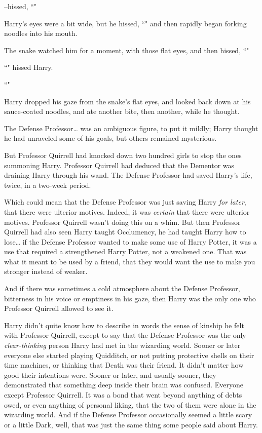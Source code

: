 \---hissed, ``"

Harry's eyes were a bit wide, but he hissed, ``" and then rapidly began forking noodles into his mouth.

The snake watched him for a moment, with those flat eyes, and then hissed, ``"

``" hissed Harry.

``"

Harry dropped his gaze from the snake's flat eyes, and looked back down at his sauce-coated noodles, and ate another bite, then another, while he thought.

The Defense Professor{\ldots} was an ambiguous figure, to put it mildly; Harry thought he had unraveled some of his goals, but others remained mysterious.

But Professor Quirrell had knocked down two hundred girls to stop the ones summoning Harry. Professor Quirrell had deduced that the Dementor was draining Harry through his wand. The Defense Professor had saved Harry's life, twice, in a two-week period.

Which could mean that the Defense Professor was just saving Harry \emph{for later}, that there were ulterior motives. Indeed, it was \emph{certain} that there were ulterior motives. Professor Quirrell wasn't doing this on a whim. But then Professor Quirrell had also seen Harry taught Occlumency, he had taught Harry how to lose{\ldots} if the Defense Professor wanted to make some use of Harry Potter, it was a use that required a strengthened Harry Potter, not a weakened one. That was what it meant to be used by a friend, that they would want the use to make you stronger instead of weaker.

And if there was sometimes a cold atmosphere about the Defense Professor, bitterness in his voice or emptiness in his gaze, then Harry was the only one who Professor Quirrell allowed to see it.

Harry didn't quite know how to describe in words the sense of kinship he felt with Professor Quirrell, except to say that the Defense Professor was the only \emph{clear-thinking} person Harry had met in the wizarding world. Sooner or later everyone else started playing Quidditch, or not putting protective shells on their time machines, or thinking that Death was their friend. It didn't matter how good their intentions were. Sooner or later, and usually sooner, they demonstrated that something deep inside their brain was confused. Everyone except Professor Quirrell. It was a bond that went beyond anything of debts owed, or even anything of personal liking, that the two of them were alone in the wizarding world. And if the Defense Professor occasionally seemed a little scary or a little Dark, well, that was just the same thing some people said about Harry.

